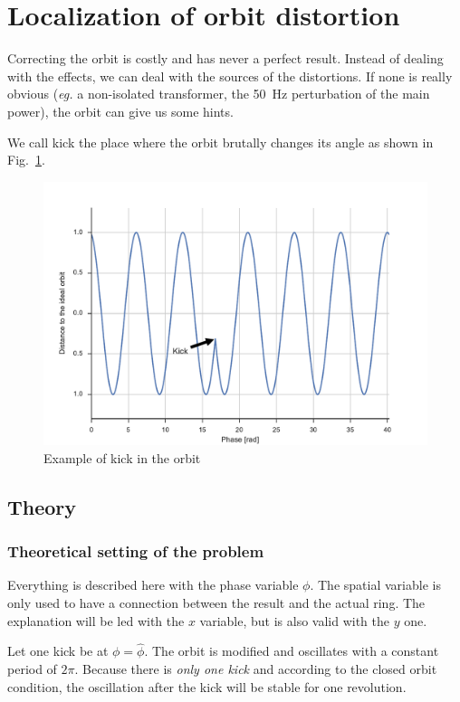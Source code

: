 
\section{Localization of orbit distortion}
\label{sec:localisation}

Correcting the orbit is costly and has never a perfect result. Instead of dealing with the effects, we can deal with the sources of the distortions. If none is really obvious (\textit{eg.} a non-isolated transformer, the 50~Hz perturbation of the main power), the orbit can give us some hints.

We call kick the place where the orbit brutally changes its angle as shown in Fig.~\ref{fig:kick}.

\begin{figure}[!h]
	\centering
	\includegraphics[width=.9\linewidth]{img/kick}
	\caption{\label{fig:kick}Example of kick in the orbit}
\end{figure}

\subsection{Theory}
\subsubsection{Theoretical setting of the problem}
Everything is described here with the phase variable $\phi$. The spatial variable is only used to have a connection between the result and the actual ring. The explanation will be led with the $x$ variable, but is also valid with the $y$ one.

Let one kick be at $\phi = \hat{\phi}$. The orbit is modified and oscillates with a constant period of $2 \pi$. Because there is {\em only one kick} and according to the closed orbit condition, the oscillation after the kick will be stable for one revolution.

